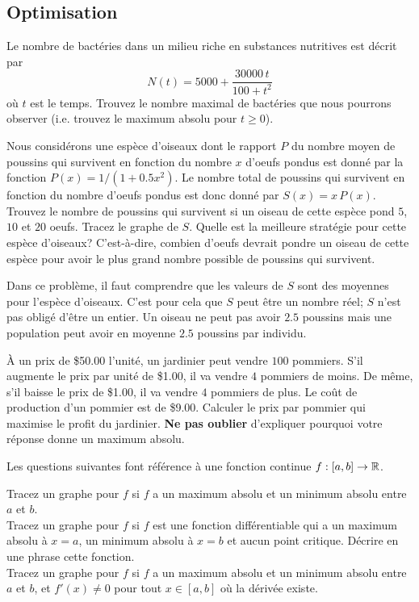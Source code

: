 \subsection{Optimisation}

\begin{question}[\life]
Le nombre de bactéries dans un milieu riche en substances nutritives est
décrit par
\[
N(t) = 5000 + \frac{30000\,t}{100+t^2}
\]
où $t$ est le temps.  Trouvez le nombre maximal de bactéries que nous
pourrons observer (i.e.  trouvez le maximum absolu pour $t\geq 0$). 
\label{6Q23}
\end{question}

\begin{question}[\life]
Nous considérons une espèce d'oiseaux dont le rapport $P$ du nombre moyen
de poussins qui survivent en fonction du nombre $x$ d'oeufs pondus est
donné par la fonction $P(x) = 1/(1+0.5 x^2)$.   Le nombre total de
poussins qui survivent en fonction du nombre d'oeufs pondus est donc
donné par $S(x) = x\,P(x)$. Trouvez le nombre de poussins qui 
survivent si un oiseau de cette espèce pond $5$, $10$ et $20$ oeufs.
Tracez le graphe de $S$.  Quelle est la meilleure stratégie pour cette
espèce d'oiseaux?  C'est-à-dire, combien d'oeufs devrait pondre un
oiseau de cette espèce pour avoir le plus grand nombre possible de
poussins qui survivent.

Dans ce problème, il faut comprendre que les valeurs de $S$ sont des
moyennes pour l'espèce d'oiseaux.  C'est pour cela que $S$ peut être
un nombre réel; $S$ n'est pas obligé d'être un entier.  Un oiseau ne
peut pas avoir $2.5$ poussins mais une population peut avoir en
moyenne $2.5$ poussins par individu.
\label{6Q24}
\end{question}

\begin{question}[\eco]
À un prix de \$50.00 l'unité, un jardinier peut vendre $100$
pommiers.  S'il augmente le prix par unité de \$1.00, il va vendre
$4$ pommiers de moins.  De même, s'il baisse le prix de
\$1.00, il va vendre $4$ pommiers de plus.  Le coût de production
d'un pommier est de \$9.00.  Calculer le prix par pommier qui maximise
le profit du jardinier.  {\bfseries Ne pas oublier} d'expliquer
pourquoi votre r\'eponse donne un maximum absolu.
\label{6Q25}
\end{question}

\begin{question}
Les questions suivantes font référence à une fonction continue
$f: [a,b] \rightarrow \mathbb{R}$.

 Tracez un graphe pour $f$ si $f$ a un maximum absolu et un
minimum absolu entre $a$ et $b$.\\
 Tracez un graphe pour $f$ si $f$ est une fonction différentiable qui
a un maximum absolu à $x=a$, un minimum absolu à $x=b$ et aucun point
critique.  Décrire en une phrase cette fonction.\\
 Tracez un graphe pour $f$ si $f$ a un maximum absolu et un
minimum absolu entre $a$ et $b$, et $f'(x)\neq 0$ pour tout $x \in [a,b]$ où
la dérivée existe.
\label{6Q26}
\end{question}

